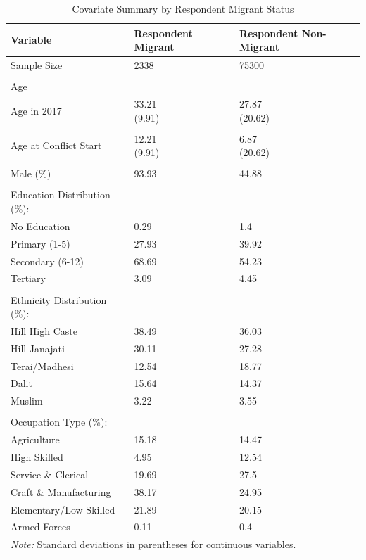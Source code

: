 \begin{table}[!h]
\centering
\caption{\label{tab:respondent_migrant_summary}Covariate Summary by Respondent Migrant Status}
\centering
\fontsize{10}{12}\selectfont
\begin{tabular}[t]{lll}
\toprule
Variable & Respondent Migrant & Respondent Non-Migrant\\
\midrule
Sample Size & 2338 & 75300\\
 &  & \\
Age &  & \\
Age in 2017 & \makecell[l]{33.21 \\ (9.91)} & \makecell[l]{27.87 \\ (20.62)}\\
 &  & \\
\addlinespace
Age at Conflict Start & \makecell[l]{12.21 \\ (9.91)} & \makecell[l]{6.87 \\ (20.62)}\\
 &  & \\
Male (\%) & 93.93 & 44.88\\
 &  & \\
Education Distribution (\%): &  & \\
\addlinespace
No Education & 0.29 & 1.4\\
Primary (1-5) & 27.93 & 39.92\\
Secondary (6-12) & 68.69 & 54.23\\
Tertiary & 3.09 & 4.45\\
 &  & \\
\addlinespace
Ethnicity Distribution (\%): &  & \\
Hill High Caste & 38.49 & 36.03\\
Hill Janajati & 30.11 & 27.28\\
Terai/Madhesi & 12.54 & 18.77\\
Dalit & 15.64 & 14.37\\
\addlinespace
Muslim & 3.22 & 3.55\\
 &  & \\
Occupation Type (\%): &  & \\
Agriculture & 15.18 & 14.47\\
High Skilled & 4.95 & 12.54\\
\addlinespace
Service \& Clerical & 19.69 & 27.5\\
Craft \& Manufacturing & 38.17 & 24.95\\
Elementary/Low Skilled & 21.89 & 20.15\\
Armed Forces & 0.11 & 0.4\\
\bottomrule
\multicolumn{3}{l}{\rule{0pt}{1em}\textit{Note: } Standard deviations in parentheses for continuous variables.}\\
\end{tabular}
\end{table}
